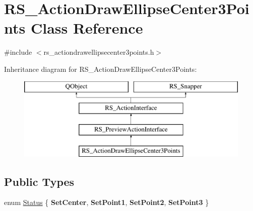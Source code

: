 \hypertarget{classRS__ActionDrawEllipseCenter3Points}{\section{R\-S\-\_\-\-Action\-Draw\-Ellipse\-Center3\-Points Class Reference}
\label{classRS__ActionDrawEllipseCenter3Points}
}


{\ttfamily \#include $<$rs\-\_\-actiondrawellipsecenter3points.\-h$>$}

Inheritance diagram for R\-S\-\_\-\-Action\-Draw\-Ellipse\-Center3\-Points\-:\begin{figure}[H]
\begin{center}
\leavevmode
\includegraphics[height=4.000000cm]{classRS__ActionDrawEllipseCenter3Points}
\end{center}
\end{figure}
\subsection*{Public Types}
\begin{DoxyCompactItemize}
\item 
enum \hyperlink{classRS__ActionDrawEllipseCenter3Points_a27797fe974f4348e0c028db1ed356aac}{Status} \{ {\bfseries Set\-Center}, 
{\bfseries Set\-Point1}, 
{\bfseries Set\-Point2}, 
{\bfseries Set\-Point3}
 \}
\end{DoxyCompactItemize}
